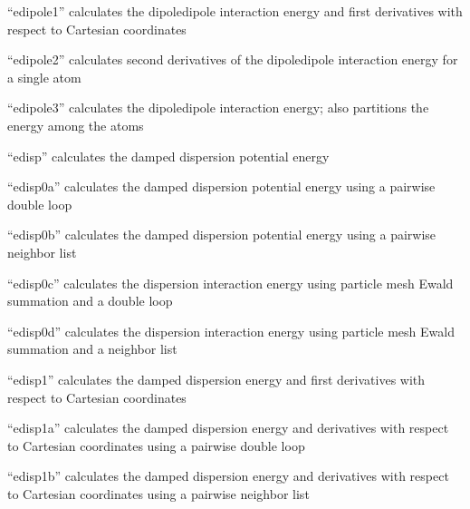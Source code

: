 \documentclass[letterpaper,11pt,english]{sphinxmanual}
\begin{document}

“edipole1” calculates the dipole\sphinxhyphen{}dipole interaction energy
and first derivatives with respect to Cartesian coordinates


“edipole2” calculates second derivatives of the
dipole\sphinxhyphen{}dipole interaction energy for a single atom


“edipole3” calculates the dipole\sphinxhyphen{}dipole interaction energy;
also partitions the energy among the atoms


“edisp” calculates the damped dispersion potential energy


“edisp0a” calculates the damped dispersion potential energy
using a pairwise double loop


“edisp0b” calculates the damped dispersion potential energy
using a pairwise neighbor list


“edisp0c” calculates the dispersion interaction energy using
particle mesh Ewald summation and a double loop


“edisp0d” calculates the dispersion interaction energy using
particle mesh Ewald summation and a neighbor list


“edisp1” calculates the damped dispersion energy and first
derivatives with respect to Cartesian coordinates


“edisp1a” calculates the damped dispersion energy and
derivatives with respect to Cartesian coordinates using
a pairwise double loop


“edisp1b” calculates the damped dispersion energy and
derivatives with respect to Cartesian coordinates using
a pairwise neighbor list

\end{document}
